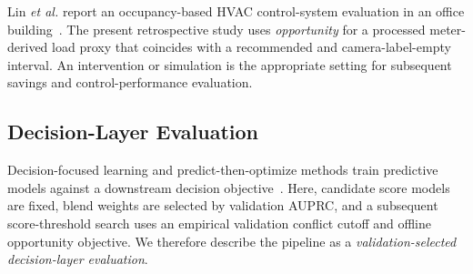 Lin \emph{et al.} report an occupancy-based HVAC control-system evaluation in an office building~\cite{Lin2023}. The present retrospective study uses \emph{opportunity} for a processed meter-derived load proxy that coincides with a recommended and camera-label-empty interval. An intervention or simulation is the appropriate setting for subsequent savings and control-performance evaluation.

\subsection{Decision-Layer Evaluation}

Decision-focused learning and predict-then-optimize methods train predictive models against a downstream decision objective~\cite{Wilder2019,ElmachtoubGrigas2022}. Here, candidate score models are fixed, blend weights are selected by validation AUPRC, and a subsequent score-threshold search uses an empirical validation conflict cutoff and offline opportunity objective. We therefore describe the pipeline as a \emph{validation-selected decision-layer evaluation}.

